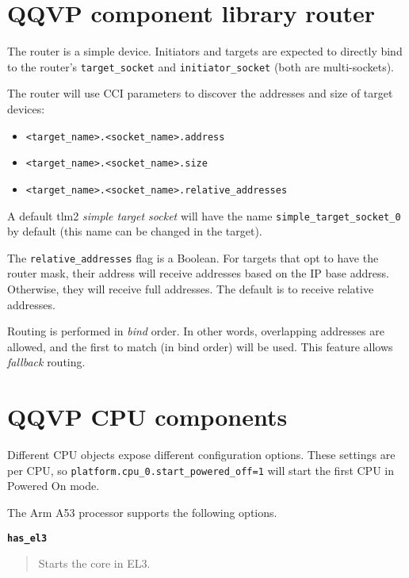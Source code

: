 \section{QQVP component library router}

The router is a simple device. Initiators and targets are expected to directly bind to the router's {\small{\lstinline!target_socket!}} and {\small{\lstinline!initiator_socket!}} (both are multi-sockets).

The router will use CCI parameters to discover the addresses and size of target devices:

\begin{itemize}
\item {\small{\lstinline!<target_name>.<socket_name>.address!}}
\item {\small{\lstinline!<target_name>.<socket_name>.size!}}
\item {\small{\lstinline!<target_name>.<socket_name>.relative_addresses!}}
\end{itemize}

A default tlm2 \emph{simple target socket} will have the name {\small{\lstinline!simple_target_socket_0!}} by default (this name can be changed in the target).

The {\small{\lstinline!relative_addresses!}} flag is a Boolean. For targets that opt to have the router mask, their address will receive addresses based on the IP base address. Otherwise, they will receive full addresses. The default is to receive relative addresses.

\note Routing is performed in \emph{bind} order. In other words, overlapping addresses are allowed, and the first to match (in bind order) will be used. This feature allows \emph{fallback} routing.


\clearpage
\section{QQVP CPU components}

Different CPU objects expose different configuration options. These settings are per CPU, so {\small{\lstinline!platform.cpu_0.start_powered_off=1!}} will start the first CPU in Powered On mode.

The Arm A53 processor supports the following options.

{\textbf {\footnotesize{\lstinline!has_el3!}}}
\vspace{-2pt}
\begin{quote}
Starts the core in EL3.
\end{quote}


